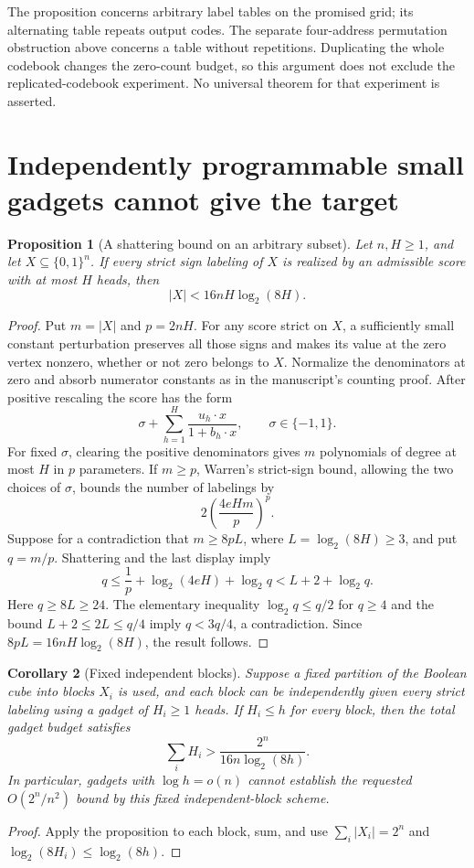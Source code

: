 \documentclass[11pt]{article}
\newtheorem{proposition}{Proposition}
\newtheorem{corollary}[proposition]{Corollary}
\begin{document}
The proposition concerns arbitrary label tables on the promised grid;
its alternating table repeats output codes. The separate four-address
permutation obstruction above concerns a table without repetitions.
Duplicating the whole codebook changes the zero-count budget, so this
argument does not exclude the replicated-codebook experiment. No
universal theorem for that experiment is asserted.

\section{Independently programmable small gadgets cannot give the target}

\begin{proposition}[A shattering bound on an arbitrary subset]
Let $n,H\geq1$, and let $X\subseteq\{0,1\}^n$. If every strict
sign labeling of $X$ is realized by an admissible score with at most
$H$ heads, then
\[
 |X|<16nH\log_2(8H).
\]
\end{proposition}
\begin{proof}
Put $m=|X|$ and $p=2nH$. For any score strict on $X$, a sufficiently
small constant perturbation preserves all those signs and makes its
value at the zero vertex nonzero, whether or not zero belongs to $X$.
Normalize the denominators at zero and absorb numerator constants as
in the manuscript's counting proof. After positive rescaling the score
has the form
\[
 \sigma+\sum_{h=1}^H\frac{u_h\cdot x}{1+b_h\cdot x},
 \qquad \sigma\in\{-1,1\}.
\]
For fixed $\sigma$, clearing the positive denominators gives $m$
polynomials of degree at most $H$ in $p$ parameters. If $m\geq p$,
Warren's strict-sign bound, allowing the two choices of $\sigma$,
bounds the number of labelings by
\[
 2\left(\frac{4eHm}{p}\right)^p.
\]
Suppose for a contradiction that $m\geq8pL$, where
$L=\log_2(8H)\geq3$, and put $q=m/p$. Shattering and the last
display imply
\[
 q\leq\frac1p+\log_2(4eH)+\log_2 q
       <L+2+\log_2 q.
\]
Here $q\geq8L\geq24$. The elementary inequality
$\log_2 q\leq q/2$ for $q\geq4$ and the bound
$L+2\leq2L\leq q/4$ imply $q<3q/4$, a contradiction.
Since $8pL=16nH\log_2(8H)$, the result follows.
\end{proof}

\begin{corollary}[Fixed independent blocks]
Suppose a fixed partition of the Boolean cube into blocks $X_i$ is
used, and each block can be independently given every strict labeling
using a gadget of $H_i\geq1$ heads. If $H_i\leq h$ for every block,
then the total gadget budget satisfies
\[
 \sum_i H_i>\frac{2^n}{16n\log_2(8h)}.
\]
In particular, gadgets with $\log h=o(n)$ cannot establish the
requested $O(2^n/n^2)$ bound by this fixed independent-block scheme.
\end{corollary}
\begin{proof}
Apply the proposition to each block, sum, and use
$\sum_i|X_i|=2^n$ and $\log_2(8H_i)\leq\log_2(8h)$.
\end{proof}
\end{document}
